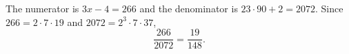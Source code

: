 The numerator is $3x-4=266$ and the denominator is $23\cdot90+2=2072$. Since $266=2\cdot7\cdot19$ and $2072=2^3\cdot7\cdot37$,
\[\dfrac{266}{2072}=\boxed{\dfrac{19}{148}}.\]

